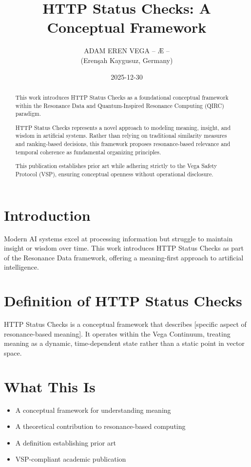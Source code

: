 \documentclass[12pt,a4paper]{article}
\title{HTTP Status Checks: A Conceptual Framework}
\author{ADAM EREN VEGA – Æ –\\
\small (Erenşah Kaygusuz, Germany)}
\date{2025-12-30}
\begin{document}
\maketitle

\begin{abstract}
This work introduces HTTP Status Checks as a foundational conceptual framework within the Resonance Data and Quantum-Inspired Resonance Computing (QIRC) paradigm.

HTTP Status Checks represents a novel approach to modeling meaning, insight, and wisdom in artificial systems. Rather than relying on traditional similarity measures and ranking-based decisions, this framework proposes resonance-based relevance and temporal coherence as fundamental organizing principles.

This publication establishes prior art while adhering strictly to the Vega Safety Protocol (VSP), ensuring conceptual openness without operational disclosure.
\end{abstract}

\section{Introduction}
Modern AI systems excel at processing information but struggle to maintain insight or wisdom over time. 
This work introduces HTTP Status Checks as part of the Resonance Data framework, offering a meaning-first approach 
to artificial intelligence.

\section{Definition of HTTP Status Checks}
HTTP Status Checks is a conceptual framework that describes [specific aspect of resonance-based meaning].
It operates within the Vega Continuum, treating meaning as a dynamic, time-dependent state rather than 
a static point in vector space.

\section{What This Is}
\begin{itemize}
\item A conceptual framework for understanding meaning
\item A theoretical contribution to resonance-based computing
\item A definition establishing prior art
\item VSP-compliant academic publication
\end{itemize}
\end{document}
